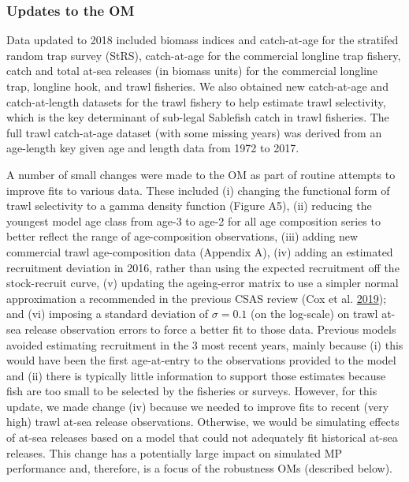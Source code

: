 \documentclass[11pt]{book}
\begin{document}
\hypertarget{updates-to-the-om}{%
\subsubsection{Updates to the OM}\label{updates-to-the-om}}

Data updated to 2018 included biomass indices and catch-at-age for the stratifed random trap survey (StRS), catch-at-age for the commercial longline trap fishery, catch and total at-sea releases (in biomass units) for the commercial longline trap, longline hook, and trawl fisheries. We also obtained new catch-at-age and catch-at-length datasets for the trawl fishery to help estimate trawl selectivity, which is the key determinant of sub-legal Sablefish catch in trawl fisheries. The full trawl catch-at-age dataset (with some missing years) was derived from an age-length key given age and length data from 1972 to 2017.

A number of small changes were made to the OM as part of routine attempts to improve fits to various data. These included (i) changing the functional form of trawl selectivity to a gamma density function (Figure A5), (ii) reducing the youngest model age class from age-3 to age-2 for all age composition series to better reflect the range of age-composition observations, (iii) adding new commercial trawl age-composition data (Appendix A), (iv) adding an estimated recruitment deviation in 2016, rather than using the expected recruitment off the stock-recruit curve, (v) updating the ageing-error matrix to use a simpler normal approximation a recommended in the previous CSAS review (Cox et al. \protect\hyperlink{ref-cox2019evaluating}{2019}); and (vi) imposing a standard deviation of \(\sigma = 0.1\) (on the log-scale) on trawl at-sea release observation errors to force a better fit to those data. Previous models avoided estimating recruitment in the 3 most recent years, mainly because (i) this would have been the first age-at-entry to the observations provided to the model and (ii) there is typically little information to support those estimates because fish are too small to be selected by the fisheries or surveys. However, for this update, we made change (iv) because we needed to improve fits to recent (very high) trawl at-sea release observations. Otherwise, we would be simulating effects of at-sea releases based on a model that could not adequately fit historical at-sea releases. This change has a potentially large impact on simulated MP performance and, therefore, is a focus of the robustness OMs (described below).
\end{document}
